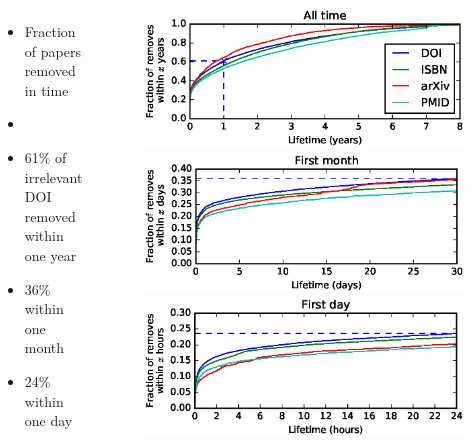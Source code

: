 \documentclass{beamer}
\begin{document}
\begin{frame}
    \begin{columns}[c]
        \begin{itemize}
            \item Fraction of papers removed in time %
            \item[]
            \item 61\% of irrelevant DOI removed within one year
            \item 36\% within one month
            \item 24\% within one day
        \end{itemize}
        \begin{figure}
        \centering
        \includegraphics[width=1\textwidth]{assets/irrelevant_identifiers_persistence_cdf_max_slides}

        \includegraphics[width=1\textwidth]{assets/irrelevant_identifiers_persistence_cdf_1month_slides}

        \includegraphics[width=1\textwidth]{assets/irrelevant_identifiers_persistence_cdf_1day_slides}
        \end{figure}
    \end{columns}
\end{frame}
\end{document}
